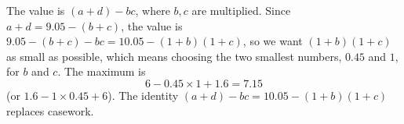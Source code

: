 The value is $(a+d)-bc$, where $b,c$ are multiplied. Since $a+d=9.05-(b+c)$, the value is $9.05-(b+c)-bc=10.05-(1+b)(1+c)$, so we want $(1+b)(1+c)$ as small as possible, which means choosing the two smallest numbers, $0.45$ and $1$, for $b$ and $c$. The maximum is
\[
6-0.45\times1+1.6=\boxed{7.15}
\]
(or $1.6-1\times0.45+6$). The identity $(a+d)-bc=10.05-(1+b)(1+c)$ replaces casework.

